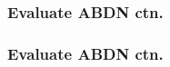 \documentclass{beamer}
\begin{document}
\begin{frame}
  \frametitle{Evaluate ABDN ctn.}
\end{frame}

\begin{frame}
  \frametitle{Evaluate ABDN ctn.}
\end{frame}
\end{document}

